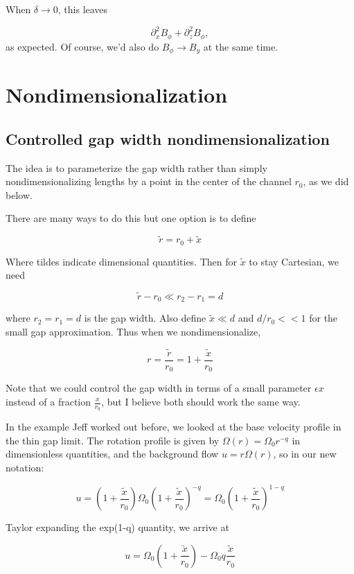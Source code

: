 \documentclass{paper}
\newcommand{\beq}{\begin{equation}}
\newcommand{\eeq}{\end{equation}}
\begin{document}
When $\delta \to 0$, this leaves

\begin{equation}
  \partial_x^2 B_\phi + \partial_z^2 B_\phi,
\end{equation}
as expected. Of course, we'd also do $B_\phi \to B_y$ at the same time.

\section{Nondimensionalization}

\subsection{Controlled gap width nondimensionalization}

The idea is to parameterize the gap width rather than simply nondimensionalizing lengths by a point in the center of the channel $r_0$, as we did below.

There are many ways to do this but one option is to define

\beq
\widetilde{r} = r_0 + \widetilde{x}
\eeq 

Where tildes indicate dimensional quantities. Then for $\widetilde{x}$ to stay Cartesian, we need

\beq
\widetilde{r} - r_0 \ll r_2 - r_1 = d
\eeq

where $r_2 = r_1 = d$ is the gap width. Also define $\widetilde{x} \ll d$ and $d/r_0 << 1$ for the small gap approximation. Thus when we nondimensionalize,

\beq
r = \frac{\widetilde{r}}{r_0} = 1 + \frac{\widetilde{x}}{r_0}
\eeq

Note that we could control the gap width in terms of a small parameter $\epsilon x$ instead of a fraction $\frac{x}{r_0}$, but I believe both should work the same way.

In the example Jeff worked out before, we looked at the base velocity profile in the thin gap limit. The rotation profile is given by $\Omega(r) = \Omega_0 r^{-q}$ in dimensionless quantities, and the background flow $u = r\Omega(r)$, so in our new notation:

\beq
u = \left(1 + \frac{\widetilde{x}}{r_0}\right) \Omega_0 \left(1 + \frac{\widetilde{x}}{r_0}\right)^{-q} = \Omega_0 \left(1 + \frac{\widetilde{x}}{r_0}\right)^{1-q}  
\eeq

Taylor expanding the exp(1-q) quantity, we arrive at

\beq
u = \Omega_0 \left(1 + \frac{\widetilde{x}}{r_0}\right) - \Omega_0 q \frac{\widetilde{x}}{r_0}
\eeq
\end{document}
